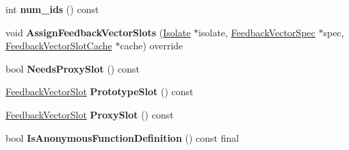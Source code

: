 \begin{DoxyCompactItemize}
\item 
int {\bfseries num\+\_\+ids} () const \hypertarget{classv8_1_1internal_1_1_class_literal_aad048ef3729aee928490dbdb26cc69b0}{}\label{classv8_1_1internal_1_1_class_literal_aad048ef3729aee928490dbdb26cc69b0}

\item 
void {\bfseries Assign\+Feedback\+Vector\+Slots} (\hyperlink{classv8_1_1internal_1_1_isolate}{Isolate} $\ast$isolate, \hyperlink{classv8_1_1internal_1_1_feedback_vector_spec}{Feedback\+Vector\+Spec} $\ast$spec, \hyperlink{classv8_1_1internal_1_1_feedback_vector_slot_cache}{Feedback\+Vector\+Slot\+Cache} $\ast$cache) override\hypertarget{classv8_1_1internal_1_1_class_literal_aa844c474418bf94af7a5943b55c35c85}{}\label{classv8_1_1internal_1_1_class_literal_aa844c474418bf94af7a5943b55c35c85}

\item 
bool {\bfseries Needs\+Proxy\+Slot} () const \hypertarget{classv8_1_1internal_1_1_class_literal_a895a6030dff95a59897dc65dcb5f8df0}{}\label{classv8_1_1internal_1_1_class_literal_a895a6030dff95a59897dc65dcb5f8df0}

\item 
\hyperlink{classv8_1_1internal_1_1_feedback_vector_slot}{Feedback\+Vector\+Slot} {\bfseries Prototype\+Slot} () const \hypertarget{classv8_1_1internal_1_1_class_literal_a01691e150bce93625406db71c1514c76}{}\label{classv8_1_1internal_1_1_class_literal_a01691e150bce93625406db71c1514c76}

\item 
\hyperlink{classv8_1_1internal_1_1_feedback_vector_slot}{Feedback\+Vector\+Slot} {\bfseries Proxy\+Slot} () const \hypertarget{classv8_1_1internal_1_1_class_literal_a80ef945b099595093aba87f81e8831f0}{}\label{classv8_1_1internal_1_1_class_literal_a80ef945b099595093aba87f81e8831f0}

\item 
bool {\bfseries Is\+Anonymous\+Function\+Definition} () const  final\hypertarget{classv8_1_1internal_1_1_class_literal_ada7208b2491f39f6437953babfaf5375}{}\label{classv8_1_1internal_1_1_class_literal_ada7208b2491f39f6437953babfaf5375}

\end{DoxyCompactItemize}
